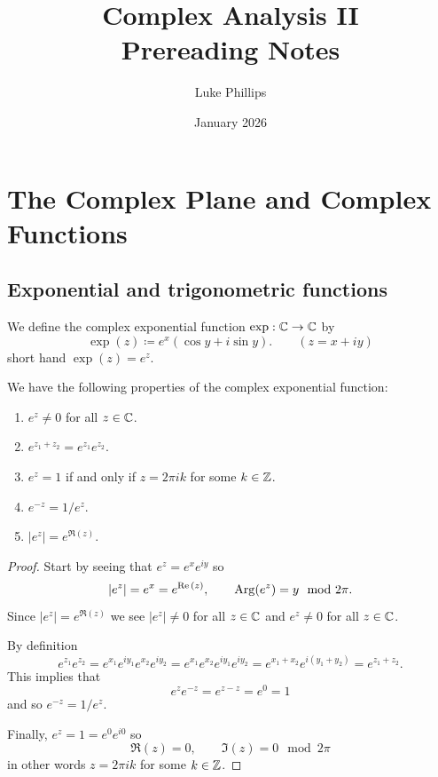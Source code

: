 \documentclass[10pt, a4paper]{article}
\title{Complex Analysis II \\
    \large Prereading Notes}
\author{Luke Phillips}
\date{January 2026}
\begin{document}
\maketitle

\newpage

\tableofcontents

\newpage

\section{The Complex Plane and Complex Functions}

\subsection{Exponential and trigonometric functions}

\begin{definition}
    We define the complex exponential function $\exp : \mathbb{C} \to \mathbb{C}$ by
    \[
    \exp(z) \coloneqq e ^ x(\cos{y} + i\sin{y}).\qquad (z = x + iy)
    \]
    short hand $\exp(z) = e ^ z$.
\end{definition}

\begin{proposition}
    We have the following properties of the complex exponential function:
    
    \begin{enumerate}[label = (\roman*)]
        \item $e ^ z \neq 0$ for all $z \in \mathbb{C}$.

        \item $e ^ {z_1 + z_2} = e ^ {z_1}e ^ {z_2}$.

        \item $e ^ z = 1$ if and only if $z = 2\pi ik$ for some $k \in \mathbb{Z}$.

        \item $e ^ {-z} = 1 / e ^ z$.

        \item $|e ^ z| = e ^ {\Re(z)}$.
    \end{enumerate}

    \begin{proof}
        Start by seeing that $e ^ {z} = e ^ xe ^ {iy}$ so
        \[
        |e ^ z| = e ^ x = e ^ {\mathrm{Re}\,(z)},\qquad \operatorname{Arg}(e ^ {z}) = y\mod{2\pi}.
        \]
        Since $|e ^ z| = e ^ {\Re(z)}$ we see $|e ^ z| \neq 0$ for all $z \in \mathbb{C}$ and $e ^ z \neq 0$ for all $z \in \mathbb{C}$.

        By definition
        \[
        e ^ {z_1}e ^ {z_2} = e ^ {x_1}e ^ {iy_1}e ^ {x_2}e ^ {iy_2} = e ^ {x_1}e ^ {x_2}e ^ {iy_1}e ^ {iy_2} = e ^ {x_1 + x_2}e ^ {i(y_1 + y_2)} = e ^ {z_1 + z_2}.
        \]
        This implies that
        \[
        e ^ {z}e ^ {-z} = e ^ {z - z} = e ^ 0 = 1
        \]
        and so $e ^ {-z} = 1 / e ^ z$.

        Finally,
        $e ^ z = 1 = e ^ 0e ^ {i0}$ so
        \[
        \Re(z) = 0,\qquad \Im(z) = 0\mod{2\pi}
        \]
        in other words $z = 2\pi ik$ for some $k \in \mathbb{Z}$.
    \end{proof}
\end{proposition}
\end{document}
